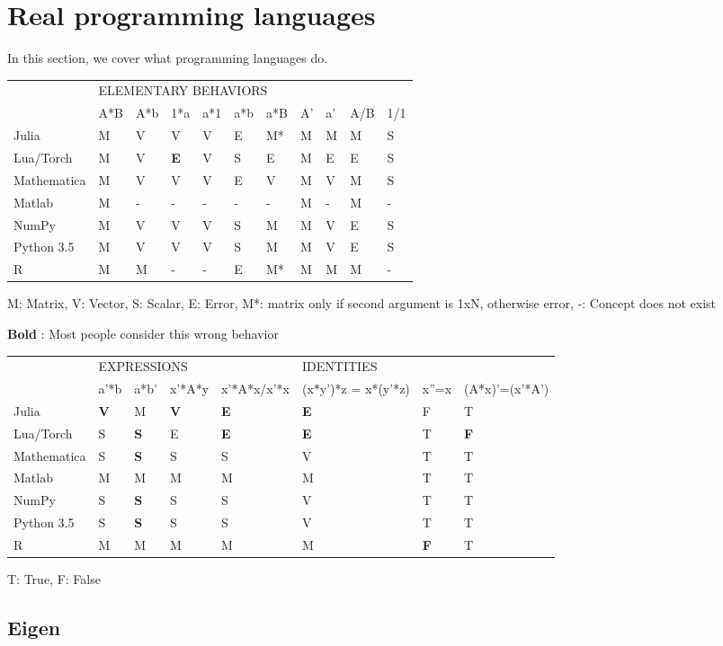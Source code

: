 \section{Real programming languages}

In this section, we cover what programming languages do.

\begin{tabular}{|l|l|l|l|l|l|l|l|l|l|l|}
\cline{2-11}
\multicolumn{1}{l|}{} & \multicolumn{10}{l|}{ELEMENTARY BEHAVIORS}\tabularnewline
\cline{2-11}
\multicolumn{1}{l|}{} & A{*}B & A{*}b & 1{*}a & a{*}1 & a{*}b & a{*}B & A' & a' & A/B & 1/1\tabularnewline
\hline
Julia & M & V & V & V & E & M{*} & M & M & M & S\tabularnewline
\hline
Lua/Torch & M & V & \textbf{E} & V & S & E & M & E & E & S\tabularnewline
\hline
Mathematica & M & V & V & V & E & V & M & V & M & S\tabularnewline
\hline
Matlab & M & - & - & - & - & - & M & - & M & -\tabularnewline
\hline
NumPy & M & V & V & V & S & M & M & V & E & S\tabularnewline
\hline
Python 3.5 & M & V & V & V & S & M & M & V & E & S\tabularnewline
\hline
R & M & M & - & - & E & M{*} & M & M & M & -\tabularnewline
\hline
\end{tabular}

M: Matrix, V: Vector, S: Scalar, E: Error, M{*}: matrix only if second
argument is 1xN, otherwise error, -: Concept does not exist

\textbf{Bold} : Most people consider this wrong behavior

\begin{tabular}{|l|l|l|l|l|l|l|l|}
\cline{2-8}
\multicolumn{1}{l|}{} & \multicolumn{4}{l|}{EXPRESSIONS} & \multicolumn{3}{l|}{IDENTITIES}\tabularnewline
\cline{2-8}
\multicolumn{1}{l|}{} & a'{*}b & a{*}b' & x'{*}A{*}y & x'{*}A{*}x/x'{*}x & (x{*}y'){*}z = x{*}(y'{*}z) & x''=x & (A{*}x)'=(x'{*}A')\tabularnewline
\hline
Julia & \textbf{V} & M & \textbf{V} & \textbf{E} & \textbf{E} & F & T\tabularnewline
\hline
Lua/Torch & S & \textbf{S} & E & \textbf{E} & \textbf{E} & T & \textbf{F}\tabularnewline
\hline
Mathematica & S & \textbf{S} & S & S & V & T & T\tabularnewline
\hline
Matlab & M & M & M & M & M & T & T\tabularnewline
\hline
NumPy & S & \textbf{S} & S & S & V & T & T\tabularnewline
\hline
Python 3.5 & S & \textbf{S} & S & S & V & T & T\tabularnewline
\hline
R & M & M & M & M & M & \textbf{F} & T\tabularnewline
\hline
\end{tabular}

T: True, F: False


\subsection{Eigen}

